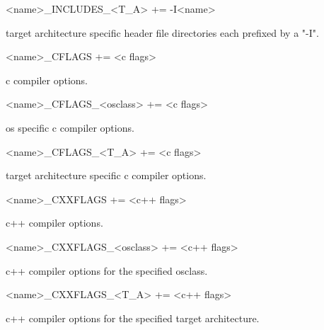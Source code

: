 \begin{description}\item \textless{}name\textgreater{}\_INCLUDES\_\textless{}T\_A\textgreater{} += -I\textless{}name\textgreater{}

\end{description}target architecture specific header file directories each prefixed by a "-I".

\begin{description}\item \textless{}name\textgreater{}\_CFLAGS += \textless{}c flags\textgreater{}

\end{description}c compiler options.

\begin{description}\item \textless{}name\textgreater{}\_CFLAGS\_\textless{}osclass\textgreater{} += \textless{}c flags\textgreater{}

\end{description}os specific c compiler options.

\begin{description}\item \textless{}name\textgreater{}\_CFLAGS\_\textless{}T\_A\textgreater{} += \textless{}c flags\textgreater{}

\end{description}target architecture specific c compiler options.

\begin{description}\item \textless{}name\textgreater{}\_CXXFLAGS += \textless{}c++ flags\textgreater{}

\end{description}c++ compiler options.

\begin{description}\item \textless{}name\textgreater{}\_CXXFLAGS\_\textless{}osclass\textgreater{} += \textless{}c++ flags\textgreater{}

\end{description}c++ compiler options for the specified osclass.

\begin{description}\item \textless{}name\textgreater{}\_CXXFLAGS\_\textless{}T\_A\textgreater{} += \textless{}c++ flags\textgreater{}

\end{description}c++ compiler options for the specified target architecture.

